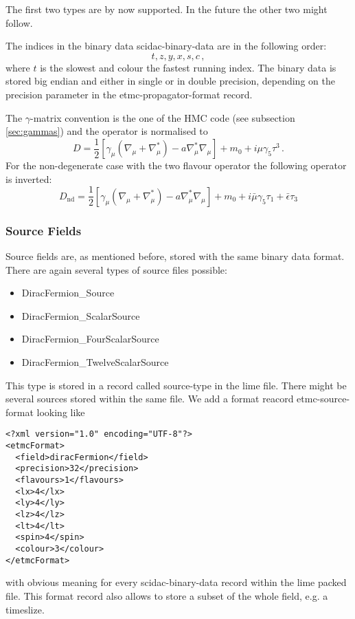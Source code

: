 The first two types are by now supported. In the future the other two
might follow.

The indices in the binary data {\ttfamily scidac-binary-data} are in
the following order:
\[
t, z, y, x, s, c\, ,
\]
where $t$ is the slowest and colour the fastest running index.
The binary data is stored big endian and either in single or in double
precision, depending on the {\ttfamily precision} parameter in the
{\ttfamily etmc-propagator-format} record. 

The $\gamma$-matrix convention is the one of the HMC code (see
subsection \ref{sec:gammas}) and the operator is normalised to
\[
D =
\frac{1}{2}[\gamma_\mu(\nabla_\mu+\nabla_\mu^*)-a\nabla_\mu^*\nabla_\mu]
+ m_0 + i \mu\gamma_5\tau^3\, .
\]
For the non-degenerate case with the two flavour operator the
following operator is inverted:
\[
D_\mathrm{nd} =
\frac{1}{2}[\gamma_\mu(\nabla_\mu+\nabla_\mu^*)-a\nabla_\mu^*\nabla_\mu]
+ m_0 + i\bar\mu\gamma_5\tau_1+\bar\epsilon\tau_3
\]

\subsubsection{Source Fields}

Source fields are, as mentioned before, stored with the same binary
data format. There are again several types of source files possible:
\begin{itemize}
\item {\ttfamily DiracFermion\_Source}
\item {\ttfamily DiracFermion\_ScalarSource}
\item {\ttfamily DiracFermion\_FourScalarSource}
\item {\ttfamily DiracFermion\_TwelveScalarSource}
\end{itemize}
This type is stored in a record called {\ttfamily source-type} in the
lime file. There might be several sources stored within the same
file. We add a format reacord {\ttfamily etmc-source-format} looking like
\begin{verbatim}
<?xml version="1.0" encoding="UTF-8"?>
<etmcFormat>
  <field>diracFermion</field>
  <precision>32</precision>
  <flavours>1</flavours>
  <lx>4</lx>
  <ly>4</ly>
  <lz>4</lz>
  <lt>4</lt>
  <spin>4</spin>
  <colour>3</colour>
</etmcFormat>
\end{verbatim}
with obvious meaning for every {\ttfamily scidac-binary-data} record
within the lime packed file. This format record also allows to store a
subset of the whole field, e.g. a timeslize.

